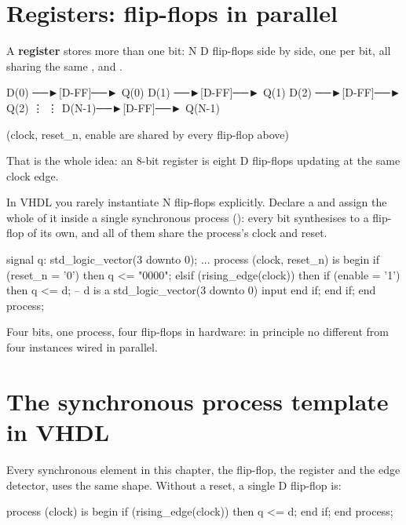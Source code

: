 \section{Registers: flip-flops in parallel}
\label{c3:sec:register}

A \textbf{register} stores more than one bit: N D flip-flops side by side, one per bit, all sharing
the same ,  and .

\begin{textdrawing}
D(0) ──►[D-FF]──► Q(0)
D(1) ──►[D-FF]──► Q(1)
D(2) ──►[D-FF]──► Q(2)
   ⋮        ⋮
D(N-1)──►[D-FF]──► Q(N-1)

  (clock, reset_n, enable are shared by every flip-flop above)
\end{textdrawing}

That is the whole idea: an 8-bit register is eight D flip-flops updating at the same clock edge.

In VHDL you rarely instantiate N flip-flops explicitly. Declare a  and
assign the whole of it inside a single synchronous process (): every bit
synthesises to a flip-flop of its own, and all of them share the process's clock and reset.

\begin{vhdlcode}
signal q: std_logic_vector(3 downto 0);
...
process (clock, reset_n) is
begin
    if (reset_n = '0') then
        q <= "0000";
    elsif (rising_edge(clock)) then
        if (enable = '1') then
            q <= d; -- d is a std_logic_vector(3 downto 0) input
        end if;
    end if;
end process;
\end{vhdlcode}

Four bits, one process, four flip-flops in hardware: in principle no different from four
 instances wired in parallel.

\section{The synchronous process template in VHDL}
\label{c3:sec:template}

Every synchronous element in this chapter, the flip-flop, the register and the edge detector, uses
the same shape. Without a reset, a single D flip-flop is:

\begin{vhdlcode}
process (clock) is
begin
    if (rising_edge(clock)) then
        q <= d;
    end if;
end process;
\end{vhdlcode}

